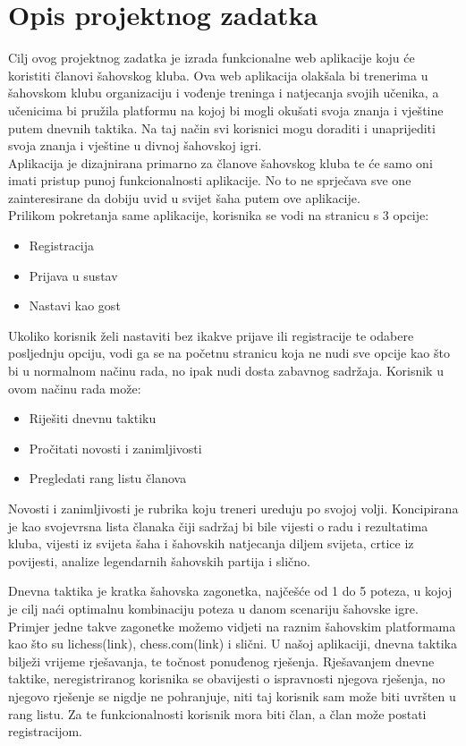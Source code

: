 \documentclass{article}
\begin{document}
	\section{Opis projektnog zadatka}
		Cilj ovog projektnog zadatka je izrada funkcionalne web aplikacije koju će koristiti članovi šahovskog kluba. Ova web aplikacija olakšala bi trenerima u šahovskom klubu organizaciju i vođenje treninga i natjecanja svojih učenika, a učenicima bi pružila platformu na kojoj bi mogli okušati svoja znanja i vještine putem dnevnih taktika. Na taj način svi korisnici mogu doraditi i unaprijediti svoja znanja i vještine u divnoj šahovskoj igri. \\ 
		Aplikacija je dizajnirana primarno za članove šahovskog kluba te će samo oni imati pristup punoj funkcionalnosti aplikacije. No to ne sprječava sve one zainteresirane da dobiju uvid u svijet šaha putem ove aplikacije. \\
		Prilikom pokretanja same aplikacije, korisnika se vodi na stranicu s 3 opcije:
		\begin{itemize}
			\item Registracija
			\item Prijava u sustav
			\item  Nastavi kao gost
		\end{itemize}
		Ukoliko korisnik želi nastaviti bez ikakve prijave ili registracije te odabere posljednju opciju, vodi ga se na početnu stranicu koja ne nudi sve opcije kao što bi u normalnom načinu rada, no ipak nudi dosta zabavnog sadržaja. Korisnik u ovom načinu rada može:
		\begin{itemize}
			\item Riješiti dnevnu taktiku 
			\item Pročitati novosti i zanimljivosti 
			\item Pregledati rang listu članova 
		\end{itemize}
		Novosti i zanimljivosti je rubrika koju treneri ureduju po svojoj volji. Koncipirana je kao svojevrsna lista članaka čiji sadržaj bi bile vijesti o radu i rezultatima kluba, vijesti iz svijeta šaha i šahovskih natjecanja diljem svijeta, crtice iz povijesti, analize legendarnih šahovskih partija i slično. 
		
		Dnevna taktika je kratka šahovska zagonetka, najčešće od 1 do 5 poteza, u kojoj je cilj naći optimalnu kombinaciju poteza u danom scenariju šahovske igre. Primjer jedne takve zagonetke možemo vidjeti na raznim šahovskim platformama kao što su lichess(link), chess.com(link) i slični. U našoj aplikaciji, dnevna taktika bilježi vrijeme rješavanja, te točnost ponuđenog rješenja. Rješavanjem dnevne taktike, neregistriranog korisnika se obavijesti o ispravnosti njegova rješenja, no njegovo rješenje se nigdje ne pohranjuje, niti taj korisnik sam može biti uvršten u rang listu. Za te funkcionalnosti korisnik mora biti član, a član može postati registracijom.\\
		
\end{document}
